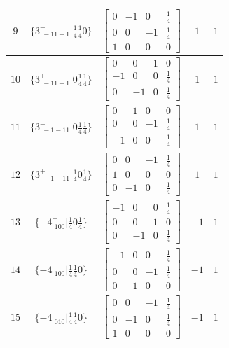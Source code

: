 \documentclass[fleqn,8pt]{jsarticle}
\begin{document}
\begin{longtable}{ccccc}
$ 9 $ & $ \{3^{-}_{\,\,-11-1}|\frac{1}{4} \frac{1}{4} 0\} $ & $ \begin{bmatrix} 0 & -1 & 0 & \frac{1}{4} \\ 0 & 0 & -1 & \frac{1}{4} \\ 1 & 0 & 0 & 0 \end{bmatrix} $ & $ 1 $ & $ 1 $ \\ \hline
$ 10 $ & $ \{3^{+}_{\,\,-11-1}|0 \frac{1}{4} \frac{1}{4}\} $ & $ \begin{bmatrix} 0 & 0 & 1 & 0 \\ -1 & 0 & 0 & \frac{1}{4} \\ 0 & -1 & 0 & \frac{1}{4} \end{bmatrix} $ & $ 1 $ & $ 1 $ \\ \hline
$ 11 $ & $ \{3^{-}_{\,\,-1-11}|0 \frac{1}{4} \frac{1}{4}\} $ & $ \begin{bmatrix} 0 & 1 & 0 & 0 \\ 0 & 0 & -1 & \frac{1}{4} \\ -1 & 0 & 0 & \frac{1}{4} \end{bmatrix} $ & $ 1 $ & $ 1 $ \\ \hline
$ 12 $ & $ \{3^{+}_{\,\,-1-11}|\frac{1}{4} 0 \frac{1}{4}\} $ & $ \begin{bmatrix} 0 & 0 & -1 & \frac{1}{4} \\ 1 & 0 & 0 & 0 \\ 0 & -1 & 0 & \frac{1}{4} \end{bmatrix} $ & $ 1 $ & $ 1 $ \\ \hline
$ 13 $ & $ \{-4^{+}_{\,\,100}|\frac{1}{4} 0 \frac{1}{4}\} $ & $ \begin{bmatrix} -1 & 0 & 0 & \frac{1}{4} \\ 0 & 0 & 1 & 0 \\ 0 & -1 & 0 & \frac{1}{4} \end{bmatrix} $ & $ -1 $ & $ 1 $ \\ \hline
$ 14 $ & $ \{-4^{-}_{\,\,100}|\frac{1}{4} \frac{1}{4} 0\} $ & $ \begin{bmatrix} -1 & 0 & 0 & \frac{1}{4} \\ 0 & 0 & -1 & \frac{1}{4} \\ 0 & 1 & 0 & 0 \end{bmatrix} $ & $ -1 $ & $ 1 $ \\ \hline
$ 15 $ & $ \{-4^{+}_{\,\,010}|\frac{1}{4} \frac{1}{4} 0\} $ & $ \begin{bmatrix} 0 & 0 & -1 & \frac{1}{4} \\ 0 & -1 & 0 & \frac{1}{4} \\ 1 & 0 & 0 & 0 \end{bmatrix} $ & $ -1 $ & $ 1 $ \\ \hline

\end{longtable}
\end{document}
